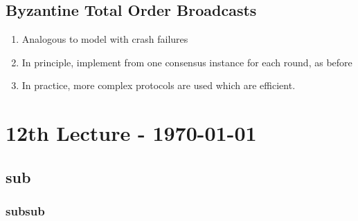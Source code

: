 \documentclass{article}
\begin{document}
\begin{adjustwidth}{2em}{2em}
		\subsection{Byzantine Total Order Broadcasts}
		\begin{adjustwidth}{2em}{2em}
			\begin{enumerate}[-]
				\item Analogous to model with crash failures
				\item In principle, implement from one consensus instance for each round, as before
				\item In practice, more complex protocols are used which are efficient.
			\end{enumerate}
		\end{adjustwidth}
	\end{adjustwidth}
	
	\newpage
	
	\section{12th Lecture - \today}
	\begin{adjustwidth}{2em}{2em}
		\subsection{sub}
		\begin{adjustwidth}{2em}{2em}
			\subsubsection{subsub}
			\begin{adjustwidth}{2em}{}
			\end{adjustwidth}
		\end{adjustwidth}
	\end{adjustwidth}
\end{document}
